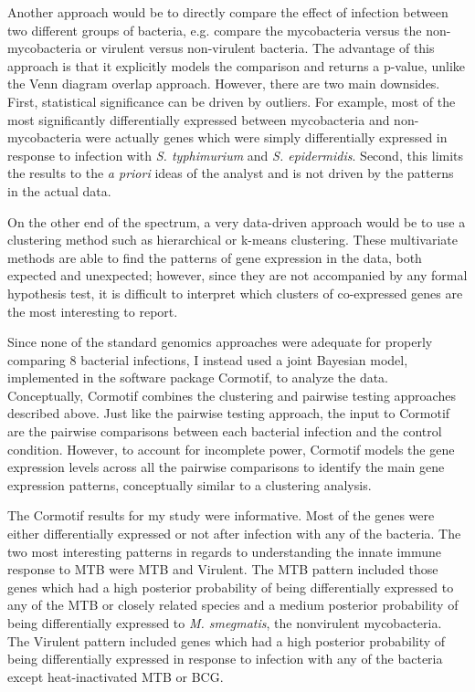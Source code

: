 Another approach would be to directly compare the effect of infection between
two different groups of bacteria, e.g. compare the mycobacteria versus the
non-mycobacteria or virulent versus non-virulent bacteria. The advantage of this
approach is that it explicitly models the comparison and returns a p-value,
unlike the Venn diagram overlap approach. However, there are two main
downsides. First, statistical significance can be driven by outliers. For
example, most of the most significantly differentially expressed between
mycobacteria and non-mycobacteria were actually genes which were simply
differentially expressed in response to infection with \emph{S. typhimurium} and
\emph{S. epidermidis}. Second, this limits the results to the \emph{a priori}
ideas of the analyst and is not driven by the patterns in the actual data.

On the other end of the spectrum, a very data-driven approach would be to use a
clustering method such as hierarchical or k-means clustering. These multivariate
methods are able to find the patterns of gene expression in the data, both
expected and unexpected; however, since they are not accompanied by any formal
hypothesis test, it is difficult to interpret which clusters of co-expressed
genes are the most interesting to report.

Since none of the standard genomics approaches were adequate for properly
comparing 8 bacterial infections, I instead used a joint Bayesian model,
implemented in the software package Cormotif, to analyze the data. Conceptually,
Cormotif combines the clustering and pairwise testing approaches described
above. Just like the pairwise testing approach, the input to Cormotif are the
pairwise comparisons between each bacterial infection and the control
condition. However, to account for incomplete power, Cormotif models the gene
expression levels across all the pairwise comparisons to identify the main gene
expression patterns, conceptually similar to a clustering analysis.

The Cormotif results for my study were informative. Most of the genes were
either differentially expressed or not after infection with any of the
bacteria. The two most interesting patterns in regards to understanding the
innate immune response to MTB were MTB and Virulent.  The MTB pattern included
those genes which had a high posterior probability of being differentially
expressed to any of the MTB or closely related species and a medium posterior
probability of being differentially expressed to \emph{M. smegmatis}, the
nonvirulent mycobacteria. The Virulent pattern included genes which had a high
posterior probability of being differentially expressed in response to infection
with any of the bacteria except heat-inactivated MTB or BCG.

